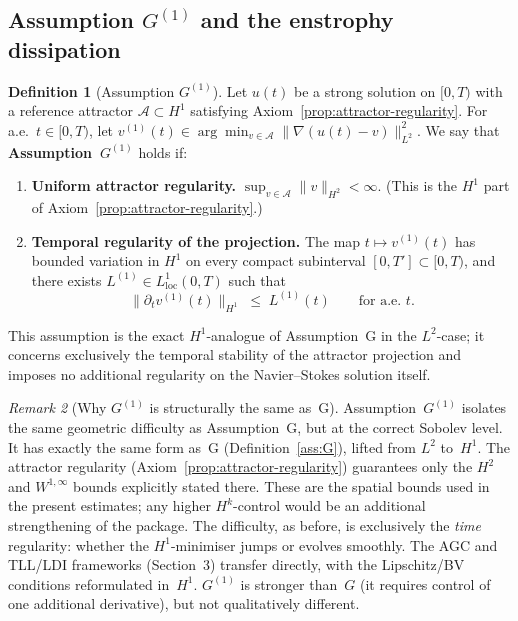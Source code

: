 \documentclass[12pt,a4paper]{article}
\theoremstyle{definition}
\newtheorem{definition}{Definition}[section]
\theoremstyle{plain}
\theoremstyle{remark}
\newtheorem{remark}[definition]{Remark}
\begin{document}
\subsection{Assumption \texorpdfstring{$G^{(1)}$}{G(1)} and the enstrophy dissipation}

\begin{definition}[Assumption $G^{(1)}$]\label{ass:G1}
Let $u(t)$ be a strong solution on $[0,T)$ with a reference attractor
$\mathcal{A} \subset H^1$ satisfying Axiom~\ref{prop:attractor-regularity}.  For a.e.\ $t \in [0,T)$, let
$v^{(1)}(t) \in \arg\min_{v \in \mathcal{A}}
\|\nabla(u(t)-v)\|_{L^2}^2$.
We say that \textbf{Assumption~$G^{(1)}$} holds if:
\begin{enumerate}
  \item[\emph{($G^{(1)}.1$)}]
    \textbf{Uniform attractor regularity.}\;
    $\sup_{v \in \mathcal{A}}\|v\|_{H^2} < \infty$.
    (This is the $H^1$ part of Axiom~\ref{prop:attractor-regularity}.)
  \item[\emph{($G^{(1)}.2$)}]
    \textbf{Temporal regularity of the projection.}\;
    The map $t \mapsto v^{(1)}(t)$ has bounded variation in $H^1$
    on every compact subinterval $[0,T'] \subset [0,T)$, and
    there exists $L^{(1)} \in L^1_{\mathrm{loc}}(0,T)$ such that
    \[
      \|\partial_t v^{(1)}(t)\|_{H^1}
      \;\le\; L^{(1)}(t)
      \qquad \text{for a.e.\ } t.
    \]
\end{enumerate}
This assumption is the exact $H^1$-analogue of Assumption~G in the
$L^2$-case; it concerns exclusively the temporal stability of the
attractor projection and imposes no additional regularity on the
Navier--Stokes solution itself.
\end{definition}

\begin{remark}[Why $G^{(1)}$ is structurally the same as~G]
Assumption~$G^{(1)}$ isolates the same geometric difficulty as
Assumption~G, but at the correct Sobolev level.
It has exactly the same form as~G
(Definition~\ref{ass:G}), lifted from $L^2$ to~$H^1$.  The
attractor regularity
(Axiom~\ref{prop:attractor-regularity}) guarantees only the
$H^2$ and $W^{1,\infty}$ bounds explicitly stated there.  These are
the spatial bounds used in the present estimates; any higher
$H^k$-control would be an additional strengthening of the package.
The difficulty, as before, is exclusively the \emph{time}
regularity: whether the $H^1$-minimiser jumps or evolves smoothly.
The AGC and TLL/LDI frameworks (Section~3) transfer directly, with
the Lipschitz/BV conditions reformulated in~$H^1$.
$G^{(1)}$ is stronger than~$G$ (it requires control of one
additional derivative), but not qualitatively different.
\end{remark}
\end{document}
